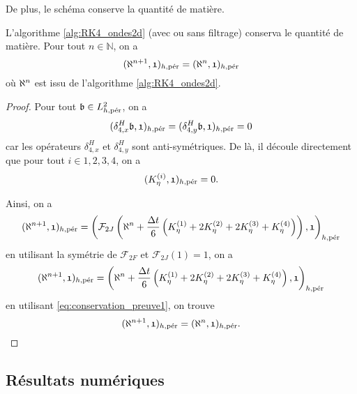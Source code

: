 De plus, le schéma conserve la quantité de matière.
\begin{proposition}
L'algorithme \ref{alg:RK4_ondes2d} (avec ou sans filtrage) conserva le quantité de matière. Pour tout $n \in \mathbb{N}$, on a 
\begin{equation}
(\etafrak^{n+1} , \mathfrak{1})_{h,\per} = (\etafrak^{n} , \mathfrak{1})_{h,\per}
\end{equation}
où $\etafrak^n$ est issu de l'algorithme \ref{alg:RK4_ondes2d}.
\end{proposition}

\begin{proof}
Pour tout $\mathfrak{b} \in L^2_{h,\per}$, on a 
\begin{equation}
(\delta_{4,x}^H \mathfrak{b}, \mathfrak{1})_{h,\per} = (\delta_{4,y}^H \mathfrak{b}, \mathfrak{1})_{h,\per} = 0
\end{equation}
car les opérateurs $\delta_{4,x}^H$ et $\delta_{4,y}^H$ sont anti-symétriques. De là, il découle directement que pour tout $i \in {1,2,3,4}$, on a 
\begin{equation}
(K_{\eta}^{(i)}, \mathfrak{1})_{h,\per} = 0.
\label{eq:conservation_preuve1}
\end{equation}

Ainsi, on a
\begin{equation}
(\etafrak^{n+1}, \mathfrak{1})_{h,\per} = \left( \mathcal{F}_{2J}\left( \etafrak^n  + \dfrac{\Delta t}{6} \left( K^{(1)}_{\eta} + 2 K^{(2)}_{\eta} + 2 K^{(3)}_{\eta} + K^{(4)}_{\eta} \right) \right) , \mathfrak{1} \right)_{h,\per}
\end{equation}
en utilisant la symétrie de $\mathcal{F}_{2F}$ et $\mathcal{F}_{2J}(\mathfrak{1}) = \mathfrak{1}$, on a
\begin{equation}
(\etafrak^{n+1}, \mathfrak{1})_{h,\per} = \left( \etafrak^n  + \dfrac{\Delta t}{6} \left( K^{(1)}_{\eta} + 2 K^{(2)}_{\eta} + 2 K^{(3)}_{\eta} + K^{(4)}_{\eta} \right) , \mathfrak{1}\right)_{h,\per}
\end{equation}
en utilisant \eqref{eq:conservation_preuve1}, on trouve
\begin{equation}
(\etafrak^{n+1} , \mathfrak{1})_{h,\per} = (\etafrak^{n} , \mathfrak{1})_{h,\per}.
\end{equation}
\end{proof}









\subsection{Résultats numériques}

